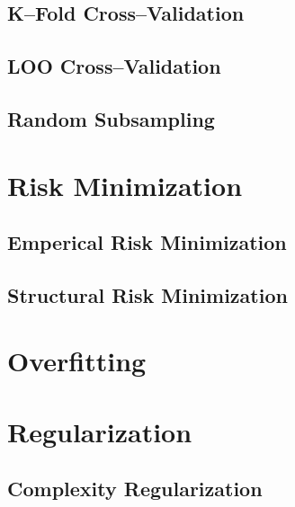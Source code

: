 \documentclass[18pt,a3paper,landscape, ncols=3]{cheatsheet}
\begin{document}
		\subsection{K--Fold Cross--Validation}
			\begin{mdframed}
			\end{mdframed}
		\subsection{LOO Cross--Validation}
			\begin{mdframed}
			\end{mdframed}
		\subsection{Random Subsampling}
			\begin{mdframed}
			\end{mdframed}

\section{Risk Minimization} \seperator
	\subsection{Emperical Risk Minimization}
		\begin{mdframed}
		\end{mdframed}
	\subsection{Structural Risk Minimization}
		\begin{mdframed}
		\end{mdframed}

\section{Overfitting} \seperator
	\begin{mdframed}
	\end{mdframed}

\section{Regularization} \seperator
	\subsection{Complexity Regularization}
		\begin{mdframed}
		\end{mdframed}
\end{document}
